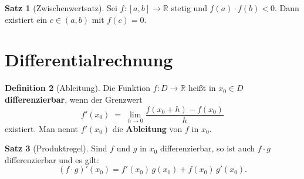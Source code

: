 \documentclass[a4paper,12pt]{article}
\theoremstyle{definition}
\newtheorem{definition}{Definition}[section]
\newtheorem{satz}[definition]{Satz}
\theoremstyle{remark}
\begin{document}
\begin{satz}[Zwischenwertsatz]
Sei $f: [a,b] \to \mathbb{R}$ stetig und $f(a) \cdot f(b) < 0$.
Dann existiert ein $c \in (a,b)$ mit $f(c) = 0$.
\end{satz}

\section{Differentialrechnung}

\begin{definition}[Ableitung]
Die Funktion $f: D \to \mathbb{R}$ heißt in $x_0 \in D$
\textbf{differenzierbar}, wenn der Grenzwert
\[
  f'(x_0) \;=\; \lim_{h \to 0} \frac{f(x_0 + h) - f(x_0)}{h}
\]
existiert. Man nennt $f'(x_0)$ die \textbf{Ableitung} von $f$ in $x_0$.
\end{definition}

\begin{satz}[Produktregel]
Sind $f$ und $g$ in $x_0$ differenzierbar, so ist auch $f \cdot g$
differenzierbar und es gilt:
\[
  (f \cdot g)'(x_0) = f'(x_0)\,g(x_0) + f(x_0)\,g'(x_0).
\]
\end{satz}
\end{document}
